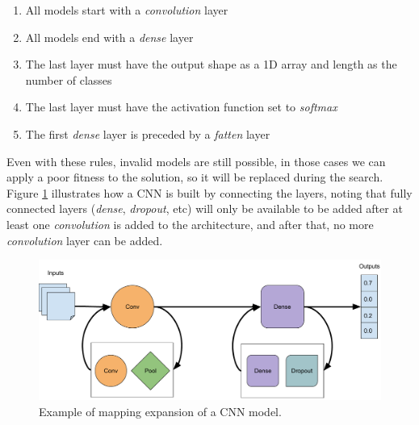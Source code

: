 \documentclass[12pt]{article}
\begin{document}
\begin{enumerate}
	\item All models start with a \textit{convolution} layer
	
	\item All models end with a \textit{dense} layer
	
	\item The last layer must have the output shape as a 1D array and length as the number of classes
	
	\item The last layer must have the activation function set to \textit{softmax}
	
	\item The first \textit{dense} layer is preceded by a \textit{fatten} layer
\end{enumerate}


Even with these rules, invalid models are still possible, in those cases we can apply a poor fitness to the solution, so it will be replaced during the search. Figure \ref{fig:cnn-map-scheme} illustrates how a CNN is built by connecting the layers, noting that fully connected layers (\textit{dense}, \textit{dropout}, etc) will only be available to be added after at least one \textit{convolution} is added to the architecture, and after that, no more \textit{convolution} layer can be added.


\begin{figure}[!htb]
	\includegraphics[width=\linewidth]{images/mapping-example.pdf}
	\caption{Example of mapping expansion of a CNN model.}
	\label{fig:cnn-map-scheme}
\end{figure}



\end{document}
